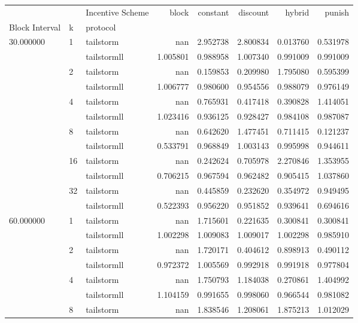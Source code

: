 \begin{tabular}{lllrrrrr}
 &  & Incentive Scheme & block & constant & discount & hybrid & punish \\
Block Interval & k & protocol &  &  &  &  &  \\
\multirow[c]{12}{*}{30.000000} & \multirow[c]{2}{*}{1} & tailstorm & nan & 2.952738 & 2.800834 & 0.013760 & 0.531978 \\
 &  & tailstormll & 1.005801 & 0.988958 & 1.007340 & 0.991009 & 0.991009 \\
 & \multirow[c]{2}{*}{2} & tailstorm & nan & 0.159853 & 0.209980 & 1.795080 & 0.595399 \\
 &  & tailstormll & 1.006777 & 0.980600 & 0.954556 & 0.988079 & 0.976149 \\
 & \multirow[c]{2}{*}{4} & tailstorm & nan & 0.765931 & 0.417418 & 0.390828 & 1.414051 \\
 &  & tailstormll & 1.023416 & 0.936125 & 0.928427 & 0.984108 & 0.987087 \\
 & \multirow[c]{2}{*}{8} & tailstorm & nan & 0.642620 & 1.477451 & 0.711415 & 0.121237 \\
 &  & tailstormll & 0.533791 & 0.968849 & 1.003143 & 0.995998 & 0.944611 \\
 & \multirow[c]{2}{*}{16} & tailstorm & nan & 0.242624 & 0.705978 & 2.270846 & 1.353955 \\
 &  & tailstormll & 0.706215 & 0.967594 & 0.962482 & 0.905415 & 1.037860 \\
 & \multirow[c]{2}{*}{32} & tailstorm & nan & 0.445859 & 0.232620 & 0.354972 & 0.949495 \\
 &  & tailstormll & 0.522393 & 0.956220 & 0.951852 & 0.939641 & 0.694616 \\
\multirow[c]{12}{*}{60.000000} & \multirow[c]{2}{*}{1} & tailstorm & nan & 1.715601 & 0.221635 & 0.300841 & 0.300841 \\
 &  & tailstormll & 1.002298 & 1.009083 & 1.009017 & 1.002298 & 0.985910 \\
 & \multirow[c]{2}{*}{2} & tailstorm & nan & 1.720171 & 0.404612 & 0.898913 & 0.490112 \\
 &  & tailstormll & 0.972372 & 1.005569 & 0.992918 & 0.991918 & 0.977804 \\
 & \multirow[c]{2}{*}{4} & tailstorm & nan & 1.750793 & 1.184038 & 0.270861 & 1.404992 \\
 &  & tailstormll & 1.104159 & 0.991655 & 0.998060 & 0.966544 & 0.981082 \\
 & \multirow[c]{2}{*}{8} & tailstorm & nan & 1.838546 & 1.208061 & 1.875213 & 1.012029 \\

\end{tabular}
